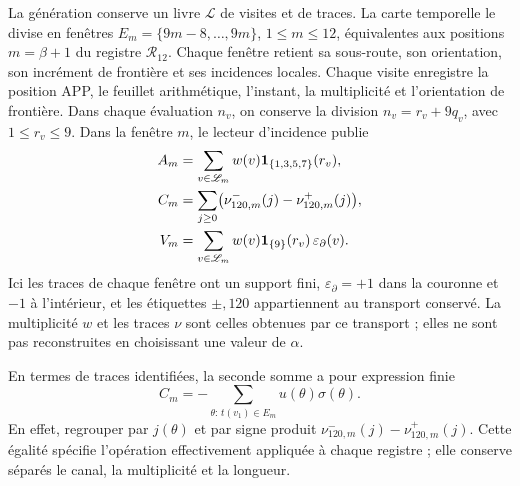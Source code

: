 La génération conserve un livre \(\mathscr L\) de visites et de traces.
La carte temporelle le divise en fenêtres
\(E_m=\{9m-8,\ldots,9m\}\), \(1\le m\le12\),
équivalentes aux positions \(m=\beta+1\) du registre
\(\mathcal R_{12}\). Chaque fenêtre retient sa sous-route,
son orientation, son incrément de frontière et ses incidences locales.
Chaque visite enregistre la position APP, le feuillet arithmétique, l'instant, la multiplicité
et l'orientation de frontière. Dans chaque évaluation \(n_v\), on conserve la
division \(n_v=r_v+9q_v\), avec \(1\le r_v\le9\). Dans la fenêtre
\(m\), le lecteur d'incidence publie
\begin{align}
 A_m&=\sum_{v\in\mathscr L_m}w(v)
      \mathbf1_{\{1,3,5,7\}}(r_v),\notag\\
 C_m&=\sum_{j\ge0}
       \bigl(\nu^-_{120,m}(j)-\nu^+_{120,m}(j)\bigr),\notag\\
 V_m&=\sum_{v\in\mathscr L_m}w(v)
      \mathbf1_{\{9\}}(r_v)\,\varepsilon_{\partial}(v).
 \label{vi:vi:dep:incidencias}
\end{align}
Ici les traces de chaque fenêtre ont un support fini,
\(\varepsilon_{\partial}=+1\) dans la couronne et \(-1\) à l’intérieur,
et les étiquettes \(\pm,120\) appartiennent au transport conservé.
La multiplicité \(w\) et les traces \(\nu\) sont celles obtenues par ce
transport ; elles ne sont pas reconstruites en choisissant une valeur de \(\alpha\).

En termes de traces identifiées, la seconde somme a pour
expression finie
\[
 C_m=-\sum_{\theta:\,t(v_1)\in E_m}u(\theta)\sigma(\theta).
\]
En effet, regrouper par \(j(\theta)\) et par signe produit
\(\nu^-_{120,m}(j)-\nu^+_{120,m}(j)\). Cette égalité spécifie
l’opération effectivement appliquée à chaque registre ; elle conserve
séparés le canal, la multiplicité et la longueur.


